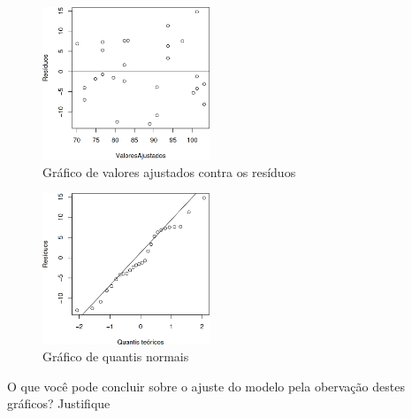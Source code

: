 \documentclass[a4paper,11pt,oneside,twocolumn]{Config/milktest}
\begin{document}
\begin{figure}[!h]
\caption{\label{f1}Gráfico de valores ajustados contra os resíduos}
\centering\includegraphics[width=5.0cm]{RV.png}
\end{figure}


\begin{figure}[!h]
\caption{\label{f2}Gráfico de quantis normais}
\centering\includegraphics[width=5.0cm]{Rq.png}
\end{figure}

O que você pode concluir sobre o ajuste do modelo pela obervação destes gráficos? Justifique



% 

% 

% 

% 
\end{document}

